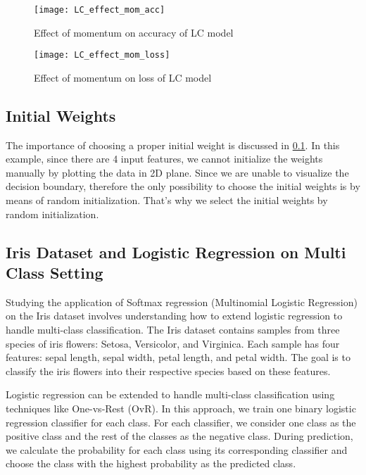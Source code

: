 \documentclass[12pt, a4paper, twoside]{article}
\begin{document}
\begin{figure}[h!]
	\centering
	\texttt{[image: LC\_effect\_mom\_acc]}
	\caption{Effect of momentum on  accuracy of LC model}
	\label{F:LC_effect_mom_acc}
\end{figure}
\begin{figure}[h!]
	\centering
	\texttt{[image: LC\_effect\_mom\_loss]}
	\caption{Effect of momentum on loss of LC model}
	\label{F:LC_effect_mom_loss}
\end{figure}

\subsection{Initial Weights}\label{SS:lc-w0}
The importance of choosing a proper initial weight is discussed in \ref{SS:lc-w0}. In this example, since there are 4 input features, we cannot initialize the weights manually by plotting the data in 2D plane. Since we are unable to visualize the decision boundary, therefore the only possibility to choose the initial weights is by means of random initialization. That's why we select the initial weights by random initialization.

\subsection{Iris Dataset and Logistic Regression on Multi Class Setting}
Studying the application of Softmax regression (Multinomial Logistic Regression) on the Iris dataset involves understanding how to extend logistic regression to handle multi-class classification. The Iris dataset contains samples from three species of iris flowers: Setosa, Versicolor, and Virginica. Each sample has four features: sepal length, sepal width, petal length, and petal width. The goal is to classify the iris flowers into their respective species based on these features.
\par
Logistic regression can be extended to handle multi-class classification using techniques like One-vs-Rest (OvR). In this approach, we train one binary logistic regression classifier for each class. For each classifier, we consider one class as the positive class and the rest of the classes as the negative class. During prediction, we calculate the probability for each class using its corresponding classifier and choose the class with the highest probability as the predicted class.

\printbibliography
\end{document}
